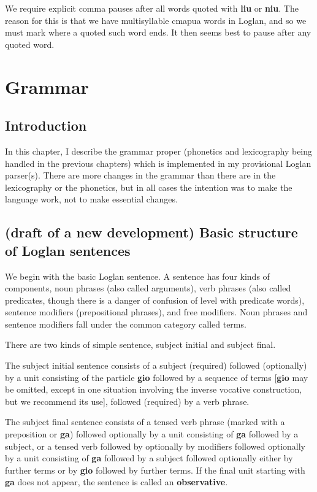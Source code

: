 \documentclass[12pt]{book}
\begin{document}
{We require explicit comma pauses after all words quoted with {\bf liu} or {\bf niu}.  The reason for this is that we have multisyllable cmapua words in Loglan, and so we must mark where a quoted such word ends.  It then seems best to pause after any quoted word.


\newpage

\chapter{Grammar}

\section{Introduction}

In this chapter, I describe the grammar proper (phonetics and lexicography being handled in the previous chapters) which is implemented in my provisional Loglan parser(s).  There are more changes in the grammar than there are in the lexicography or the phonetics, but in all cases the intention was to make the language work, not to make essential changes.

\section{(draft of a new development) Basic structure of Loglan sentences}

We begin with the basic Loglan sentence.  A sentence has four kinds of components, noun phrases (also called arguments), verb phrases (also called predicates, though there is a danger of confusion of level with predicate words), sentence modifiers (prepositional phrases), and free modifiers.  Noun phrases and sentence modifiers fall under the common category called terms.

There are two kinds of simple sentence, subject initial and subject final.  

The subject initial sentence consists of a subject (required) followed (optionally) by a unit consisting of the particle {\bf gio} followed by a sequence of terms [{\bf gio} may be omitted, except in one situation involving the inverse vocative construction, but we recommend its use], followed (required) by a verb phrase.

The subject final sentence consists of a tensed verb phrase (marked with a preposition or {\bf ga}) followed optionally by a unit consisting of {\bf ga} followed by a subject, or a tensed verb followed by optionally by modifiers followed optionally by a unit consisting of {\bf ga} followed by a subject followed optionally either by further terms or by {\bf gio} followed by further terms.
If the final unit starting with {\bf ga} does not appear, the sentence is called an {\bf observative\/}.

}
\end{document}
